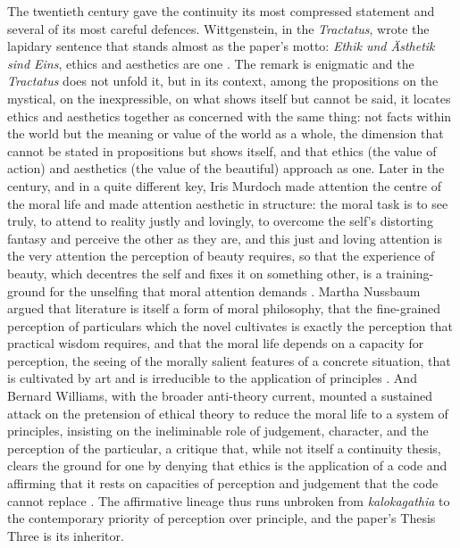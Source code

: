 The twentieth century gave the continuity its most compressed statement and several of its most careful defences. Wittgenstein, in the \emph{Tractatus}, wrote the lapidary sentence that stands almost as the paper's motto: \emph{Ethik und \"Asthetik sind Eins}, ethics and aesthetics are one \parencite{wittgenstein1974}. The remark is enigmatic and the \emph{Tractatus} does not unfold it, but in its context, among the propositions on the mystical, on the inexpressible, on what shows itself but cannot be said, it locates ethics and aesthetics together as concerned with the same thing: not facts within the world but the meaning or value of the world as a whole, the dimension that cannot be stated in propositions but shows itself, and that ethics (the value of action) and aesthetics (the value of the beautiful) approach as one. Later in the century, and in a quite different key, Iris Murdoch made attention the centre of the moral life and made attention aesthetic in structure: the moral task is to see truly, to attend to reality justly and lovingly, to overcome the self's distorting fantasy and perceive the other as they are, and this just and loving attention is the very attention the perception of beauty requires, so that the experience of beauty, which decentres the self and fixes it on something other, is a training-ground for the unselfing that moral attention demands \parencite{murdoch1970}. Martha Nussbaum argued that literature is itself a form of moral philosophy, that the fine-grained perception of particulars which the novel cultivates is exactly the perception that practical wisdom requires, and that the moral life depends on a capacity for perception, the seeing of the morally salient features of a concrete situation, that is cultivated by art and is irreducible to the application of principles \parencite{nussbaum1990}. And Bernard Williams, with the broader anti-theory current, mounted a sustained attack on the pretension of ethical theory to reduce the moral life to a system of principles, insisting on the ineliminable role of judgement, character, and the perception of the particular, a critique that, while not itself a continuity thesis, clears the ground for one by denying that ethics is the application of a code and affirming that it rests on capacities of perception and judgement that the code cannot replace \parencite{williams1985}. The affirmative lineage thus runs unbroken from \emph{kalokagathia} to the contemporary priority of perception over principle, and the paper's Thesis Three is its inheritor.

